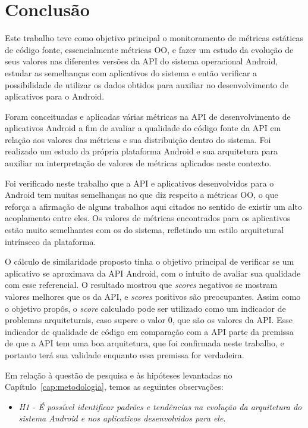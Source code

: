 \chapter{Conclusão}
\label{consideracoes-finais}

Este trabalho teve como objetivo principal o monitoramento de métricas estáticas de código fonte, essencialmente métricas OO, e fazer um estudo da evolução de seus valores nas diferentes versões da API do sistema operacional Android, estudar as semelhanças com aplicativos do sistema e então verificar a possibilidade de utilizar os dados obtidos para auxiliar no desenvolvimento de aplicativos para o Android.

Foram conceituadas e aplicadas várias métricas na API de desenvolvimento de aplicativos Android a fim de avaliar a qualidade do código fonte da API em relação aos valores das métricas e sua distribuição dentro do sistema. Foi realizado um estudo da própria plataforma Android e sua arquitetura para auxiliar na interpretação de valores de métricas aplicados neste contexto. 

Foi verificado neste trabalho que a API e aplicativos desenvolvidos para o Android tem muitas semelhanças no que diz respeito a métricas OO, o que reforça a afirmação de alguns trabalhos aqui citados no sentido de existir um alto acoplamento entre eles. Os valores de métricas encontrados para os aplicativos estão muito semelhantes com os do sistema, refletindo um estilo arquitetural intrínseco da plataforma.

O cálculo de similaridade proposto tinha o objetivo principal de verificar se um aplicativo se aproximava da API Android, com o intuito de avaliar sua qualidade com esse referencial. O resultado mostrou que \textit{scores} negativos se mostram valores melhores que os da API, e \textit{scores} positivos são preocupantes. Assim como o objetivo propôs, o \textit{score} calculado pode ser utilizado como um indicador de problemas arquiteturais, caso supere o valor 0, que são os valores da API. Esse indicador de qualidade de código em comparação com a API parte da premissa de que a API tem uma boa arquitetura, que foi confirmada neste trabalho, e portanto terá sua validade enquanto essa premissa for verdadeira.

Em relação à questão de pesquisa e às hipóteses levantadas no Capítulo~\ref{cap:metodologia}, temos as seguintes observações:

\begin{itemize}
\item \textit{H1 - É possível identificar padrões e tendências na evolução da arquitetura do sistema Android e nos aplicativos desenvolvidos para ele.}
\end{itemize}

